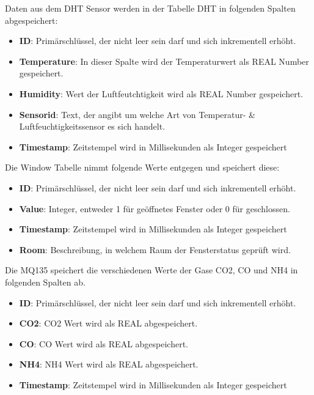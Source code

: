 Daten aus dem DHT Sensor werden in der Tabelle DHT in folgenden Spalten abgespeichert:
\begin{itemize}
	\item \textbf{ID}: Primärschlüssel, der nicht leer sein darf und sich inkrementell erhöht.  
	\item \textbf{Temperature}: In dieser Spalte wird der Temperaturwert als REAL Number gespeichert.
	\item \textbf{Humidity}: Wert der Luftfeutchtigkeit wird als REAL Number gespeichert.
	\item \textbf{Sensorid}: Text, der angibt um welche Art von Temperatur- \& Luftfeuchtigkeitssensor es sich handelt.
	\item \textbf{Timestamp}: Zeitstempel wird in Millisekunden als Integer gespeichert
\end{itemize}

Die Window Tabelle nimmt folgende Werte entgegen und speichert diese:
\begin{itemize}
	\item \textbf{ID}: Primärschlüssel, der nicht leer sein darf und sich inkrementell erhöht.  
	\item \textbf{Value}: Integer, entweder 1 für geöffnetes Fenster oder 0 für geschlossen.
	\item \textbf{Timestamp}: Zeitstempel wird in Millisekunden als Integer gespeichert
	\item \textbf{Room}: Beschreibung, in welchem Raum der Fensterstatus geprüft wird. 
\end{itemize}

Die MQ135 speichert die verschiedenen Werte der Gase CO2, CO und NH4 in folgenden Spalten ab.
\begin{itemize}
	\item \textbf{ID}: Primärschlüssel, der nicht leer sein darf und sich inkrementell erhöht.  
	\item \textbf{CO2}: CO2 Wert wird als REAL abgespeichert.
	\item \textbf{CO}: CO Wert wird als REAL abgespeichert.
	\item \textbf{NH4}: NH4 Wert wird als REAL abgespeichert. 
	\item \textbf{Timestamp}: Zeitstempel wird in Millisekunden als Integer gespeichert
\end{itemize}

